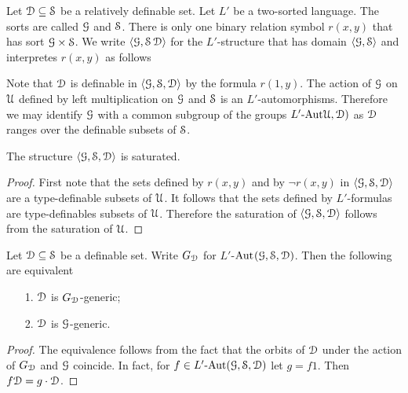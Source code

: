 \documentclass[creche.tex]{subfiles}
\begin{document}
Let $\D\subseteq\S$ be a relatively definable set.
Let $L'$ be a two-sorted language.
The sorts are called $\G$ and $\S$.
There is only one binary relation symbol $r(x,y)$ that has sort $\G\times\S$.
We write $\langle\G, \S\, \D\rangle$ for the $L'$-structure that has domain $\langle\G, \S\rangle$ and interpretes $r(x,y)$ as follows 


Note that $\D$ is definable in $\langle\G,\S, \D\rangle$ by the formula $r(1,y)$.
The action of $\G$ on $\U$ defined by left multiplication on $\G$ and $\S$ is an $L'$-automorphisms.
Therefore we may identify $\G$ with a common subgroup of the groups $L'\mbox{-Aut}\U,{\D})$ as $\D$ ranges over the definable subsets of $\S$.

\begin{fact}
  The structure $\langle\G,\S, \D\rangle$ is saturated.
\end{fact}

\begin{proof}
  First note that the sets defined by $r(x,y)$ and by $\neg r(x,y)$ in $\langle\G,\S, \D\rangle$ are a type-definable subsets of $\U$.
  It follows that the sets defined by $L'$-formulas are type-definables subsets of $\U$.
  Therefore the saturation of $\langle\G,\S, \D\rangle$ follows from the saturation of $\U$.
\end{proof}


\begin{fact}\label{fact_generic_G_L}
Let $\D\subseteq\S$ be a definable set.
Write $G_{\D}$ for $L'$-$\Aut(\G,\S,{\D})$.
Then the following are equivalent
\begin{itemize}
  \item[1.] $\D$ is $G_{\D}$-generic;
  \item[2.] $\D$ is $\G$-generic.
\end{itemize}
\end{fact}

\begin{proof}
  The equivalence follows from the fact that the orbits of $\D$ under the action of $G_{\D}$ and $\G$ coincide.
  In fact, for $f\in L'\mbox{-Aut}(\G,\S,\D)$ let $g=f1$.
  Then $f{\D}=g\cdot\D$.
\end{proof}
\end{document}
